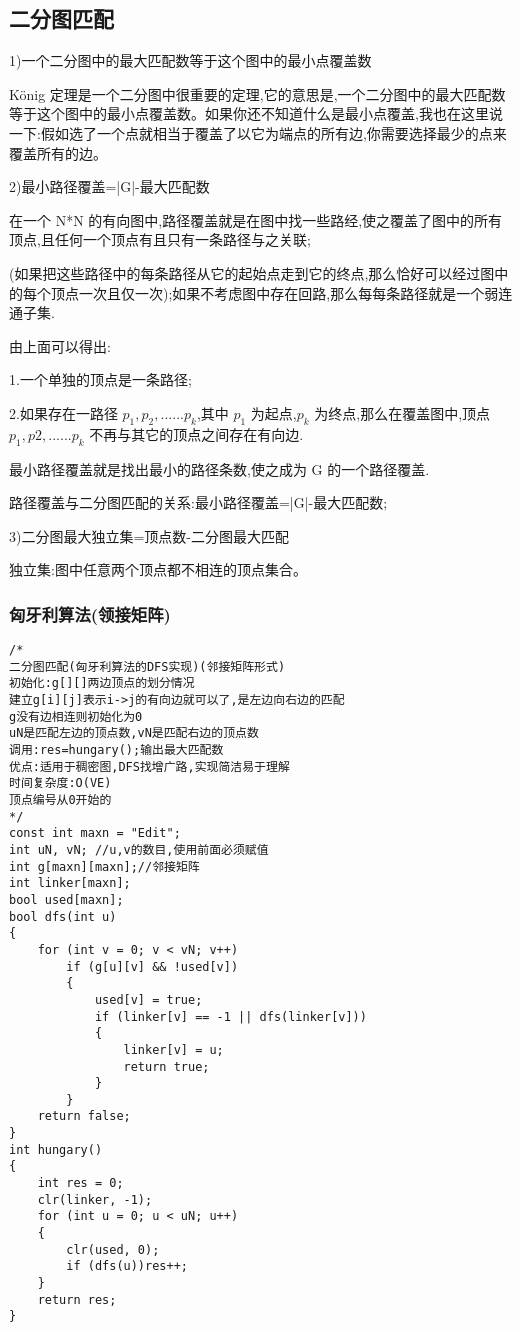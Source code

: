 \documentclass[a4]{article}
\begin{document}
\subsection{二分图匹配}
1)一个二分图中的最大匹配数等于这个图中的最小点覆盖数

König 定理是一个二分图中很重要的定理,它的意思是,一个二分图中的最大匹配数等于这个图中的最小点覆盖数。如果你还不知道什么是最小点覆盖,我也在这里说一下:假如选了一个点就相当于覆盖了以它为端点的所有边,你需要选择最少的点来覆盖所有的边。

2)最小路径覆盖=|G|-最大匹配数

在一个 N*N 的有向图中,路径覆盖就是在图中找一些路经,使之覆盖了图中的所有顶点,且任何一个顶点有且只有一条路径与之关联;

(如果把这些路径中的每条路径从它的起始点走到它的终点,那么恰好可以经过图中的每个顶点一次且仅一次);如果不考虑图中存在回路,那么每每条路径就是一个弱连通子集.

由上面可以得出:

1.一个单独的顶点是一条路径;

2.如果存在一路径 $p_1,p_2,......p_k$,其中 $p_1$ 为起点,$p_k$ 为终点,那么在覆盖图中,顶点 $p_1,p2,......p_k$ 不再与其它的顶点之间存在有向边.

最小路径覆盖就是找出最小的路径条数,使之成为 G 的一个路径覆盖.

路径覆盖与二分图匹配的关系:最小路径覆盖=|G|-最大匹配数;

3)二分图最大独立集=顶点数-二分图最大匹配

独立集:图中任意两个顶点都不相连的顶点集合。
\subsubsection{匈牙利算法(领接矩阵)}
\begin{lstlisting}
/*
二分图匹配(匈牙利算法的DFS实现)(邻接矩阵形式)
初始化:g[][]两边顶点的划分情况
建立g[i][j]表示i->j的有向边就可以了,是左边向右边的匹配
g没有边相连则初始化为0
uN是匹配左边的顶点数,vN是匹配右边的顶点数
调用:res=hungary();输出最大匹配数
优点:适用于稠密图,DFS找增广路,实现简洁易于理解
时间复杂度:O(VE)
顶点编号从0开始的
*/
const int maxn = "Edit";
int uN, vN; //u,v的数目,使用前面必须赋值
int g[maxn][maxn];//邻接矩阵
int linker[maxn];
bool used[maxn];
bool dfs(int u)
{
    for (int v = 0; v < vN; v++)
        if (g[u][v] && !used[v])
        {
            used[v] = true;
            if (linker[v] == -1 || dfs(linker[v]))
            {
                linker[v] = u;
                return true;
            }
        }
    return false;
}
int hungary()
{
    int res = 0;
    clr(linker, -1);
    for (int u = 0; u < uN; u++)
    {
        clr(used, 0);
        if (dfs(u))res++;
    }
    return res;
}
\end{lstlisting}
\end{document}
